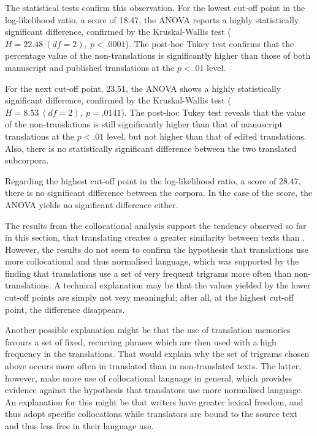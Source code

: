 \documentclass[output=paper]{LSP/langsci}
\begin{document}
\noindent The statistical tests confirm this observation. For the lowest cut-off point in the log-likelihood ratio, a score of 18.47, the ANOVA reports a highly statistically significant difference, confirmed by the Kruskal-Wallis test ($H=22.48~(df=2),~p<.0001$). The post-hoc Tukey test confirms that the percentage value of the non-translations is significantly higher than those of both manuscript and published translations at the $p<.01$ level.

For the next cut-off point, 23.51, the ANOVA shows a highly statistically significant difference, confirmed by the Kruskal-Wallis test ($H=8.53~(df=2),~p=.0141$). The post-hoc Tukey test reveals that the value of the non-translations is still significantly higher than that of manuscript translations at the $p<.01$ level, but not higher than that of edited translations. Also, there is no statistically significant difference between the two translated subcorpora.

Regarding the highest cut-off point in the log-likelihood ratio, a score of 28.47, there is no significant difference between the corpora. In the case of the  score, the ANOVA yields no significant difference either.

The results from the collocational analysis support the tendency observed so far in this section, that translating creates a greater similarity between texts than . However, the results do not seem to confirm the hypothesis that translations use more collocational and thus normalised language, which was supported by the finding that translations use a set of very frequent trigrams more often than non-translations. A technical explanation may be that the values yielded by the lower cut-off points are simply not very meaningful; after all, at the highest cut-off point, the difference disappears.

Another possible explanation might be that the use of translation memories favours a set of fixed, recurring phrases which are then used with a high frequency in the translations. That would explain why the set of trigrams chosen above occurs more often in translated than in non-translated texts. The latter, however, make more use of collocational language in general, which provides evidence against the hypothesis that translators use more normalised language. An explanation for this might be that writers have greater lexical freedom, and thus adopt specific collocations while translators are bound to the source text and thus less free in their language use.
\end{document}
